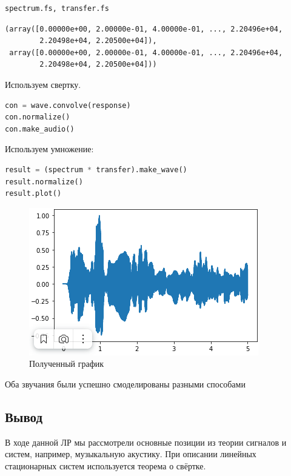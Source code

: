 \begin{lstlisting}[language=Python]
spectrum.fs, transfer.fs
\end{lstlisting}
\begin{lstlisting}
(array([0.00000e+00, 2.00000e-01, 4.00000e-01, ..., 2.20496e+04,
        2.20498e+04, 2.20500e+04]),
 array([0.00000e+00, 2.00000e-01, 4.00000e-01, ..., 2.20496e+04,
        2.20498e+04, 2.20500e+04]))
\end{lstlisting}

Используем свертку.

\begin{lstlisting}[language=Python]
con = wave.convolve(response)
con.normalize()
con.make_audio()
\end{lstlisting}

Используем умножение:
\begin{lstlisting}[language=Python]
result = (spectrum * transfer).make_wave()
result.normalize()
result.plot()
\end{lstlisting}

\begin{figure}[H]
	\begin{center}
		\includegraphics[scale=1]{fig/lab10/lab10_7.png}
		\caption{Полученный график}
	\end{center}
\end{figure}

Оба звучания были успешно смоделированы разными способами

\subsection{Вывод}

В ходе данной ЛР мы рассмотрели основные позиции из теории сигналов и систем, например, музыкальную акустику. При описании линейных стационарных систем используется теорема о свёртке.
